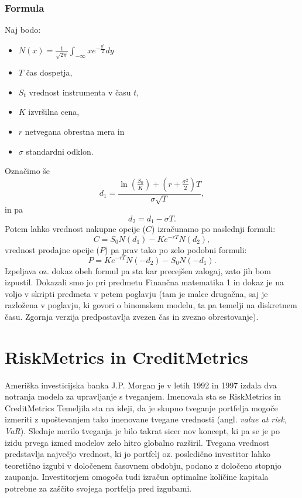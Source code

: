 \documentclass[12pt,a4paper]{amsart}
\theoremstyle{definition} %
\theoremstyle{plain} %
\begin{document}
\subsubsection{Formula}
Naj bodo:
\begin{itemize}
  \item $N(x) = \frac{1}{\sqrt{2\pi}} \int_{-\infty}{x} e^{-\frac{y^2}{2}} dy$
  \item $T$ čas dospetja,
  \item $S_t$ vrednost instrumenta v času $t$,
  \item $K$ izvršilna cena,
  \item $r$ netvegana obrestna mera in
  \item $\sigma$ standardni odklon.
\end{itemize}
Označimo še
$$d_1 = \frac{\ln (\frac{S_0}{K}) + (r + \frac{\sigma^2}{2})T}{\sigma \sqrt{T}},$$
in pa 
$$d_2 = d_1 -  \sigma T.$$
Potem lahko vrednost nakupne opcije ($C$) izračunamo po naslednji formuli:
\begin{equation}\label{bs1}
C = S_0 N(d_1) - Ke^{-rT}N(d_2),
\end{equation}
vrednost prodajne opcije ($P$) pa prav tako po zelo podobni formuli:
\begin{equation}\label{bs2}
P = Ke^{-rT}N(-d_2) - S_0 N(-d_1).
\end{equation}
Izpeljava oz. dokaz obeh formul pa sta kar precejšen zalogaj, zato jih bom izpustil. Dokazali smo
jo pri predmetu Finančna matematika 1 in dokaz je na voljo v skripti predmeta v petem poglavju
(tam je malce drugačna, saj je razložena v poglavju, ki govori o binomskem modelu, ta pa temelji
na diskretnem času. Zgornja verzija predpostavlja zvezen čas in zvezno obrestovanje).


\section{RiskMetrics in CreditMetrics}
%
Ameriška investicijska banka J.P. Morgan je v letih 1992 in 1997 izdala dva notranja 
modela za upravljanje s tveganjem. Imenovala sta se RiskMetrics in CreditMetrics
Temeljila sta na ideji, da je skupno tveganje portfelja
mogoče izmeriti z upoštevanjem tako imenovane tvegane vrednosti (angl. \textit{value
at risk, VaR}). Slednje merilo tveganja je bilo takrat sicer nov koncept, ki pa se je po izidu
prvega izmed modelov zelo hitro globalno razširil. Tvegana vrednost predstavlja največjo
vrednost, ki jo portfelj oz. posledično investitor lahko teoretično izgubi v določenem 
časovnem obdobju, podano z določeno stopnjo zaupanja. Investitorjem omogoča tudi
izračun optimalne količine kapitala potrebne za zaščito svojega portfelja pred izgubami.
\end{document}
